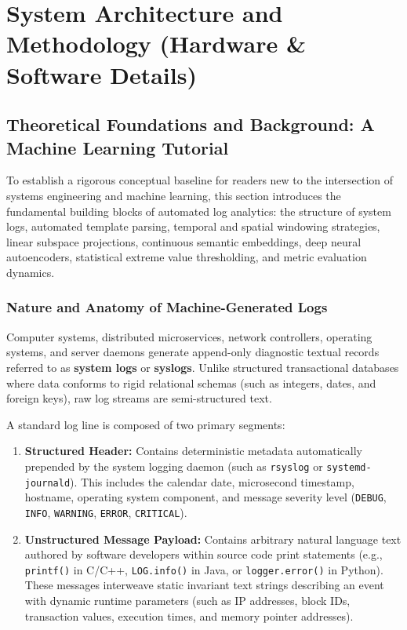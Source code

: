 \chapter{System Architecture and Methodology (Hardware \& Software Details)}
\label{ch:sys_arch}

\section{Theoretical Foundations and Background: A Machine Learning Tutorial}
\label{sec:arch_background}
To establish a rigorous conceptual baseline for readers new to the intersection of systems engineering and machine learning, this section introduces the fundamental building blocks of automated log analytics: the structure of system logs, automated template parsing, temporal and spatial windowing strategies, linear subspace projections, continuous semantic embeddings, deep neural autoencoders, statistical extreme value thresholding, and metric evaluation dynamics.

\subsection{Nature and Anatomy of Machine-Generated Logs}
\label{subsec:log_anatomy}
Computer systems, distributed microservices, network controllers, operating systems, and server daemons generate append-only diagnostic textual records referred to as \textbf{system logs} or \textbf{syslogs}. Unlike structured transactional databases where data conforms to rigid relational schemas (such as integers, dates, and foreign keys), raw log streams are semi-structured text. 

A standard log line is composed of two primary segments:
\begin{enumerate}
    \item \textbf{Structured Header:} Contains deterministic metadata automatically prepended by the system logging daemon (such as \texttt{rsyslog} or \texttt{systemd-journald}). This includes the calendar date, microsecond timestamp, hostname, operating system component, and message severity level (\texttt{DEBUG}, \texttt{INFO}, \texttt{WARNING}, \texttt{ERROR}, \texttt{CRITICAL}).
    \item \textbf{Unstructured Message Payload:} Contains arbitrary natural language text authored by software developers within source code print statements (e.g., \texttt{printf()} in C/C++, \texttt{LOG.info()} in Java, or \texttt{logger.error()} in Python). These messages interweave static invariant text strings describing an event with dynamic runtime parameters (such as IP addresses, block IDs, transaction values, execution times, and memory pointer addresses).
\end{enumerate}

